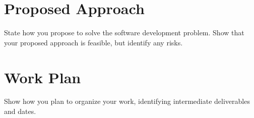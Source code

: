 \documentclass{proposal}
\begin{document}
    \section{Proposed Approach}\label{sec:proposed-approach}

    State how you propose to solve the software development problem.
    Show that your proposed approach is feasible, but identify any risks.




    \section{Work Plan}\label{sec:work-plan}

    Show how you plan to organize your work, identifying intermediate deliverables and dates.




    
    
\end{document}
